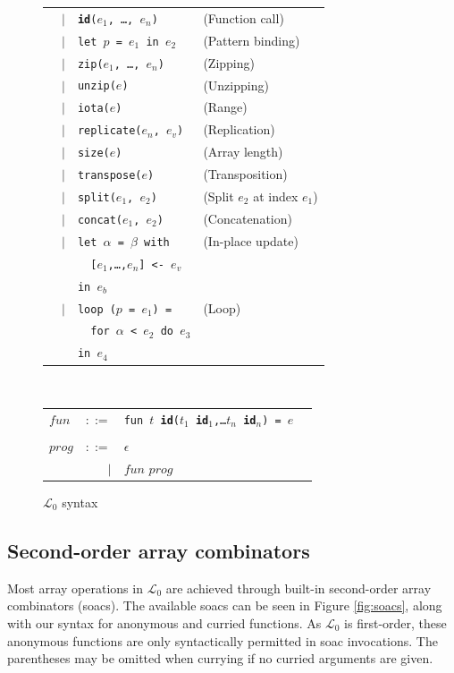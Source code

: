\documentclass{sigplanconf}  %
\newcommand{\LO}{$\mathcal{L}_0$}
\begin{document}
\begin{figure}[bt]
\begin{tabular}{lrll}
& $|$ & {\tt {\bf id}($e_{1}$, \ldots, $e_{n}$)} & (Function call) \\
& $|$ & {\tt let $p$ = $e_{1}$ in $e_{2}$} & (Pattern binding) \\
& $|$ & {\tt zip($e_{1}$, \ldots, $e_{n}$)} & (Zipping) \\
& $|$ & {\tt unzip($e$)} & (Unzipping) \\
& $|$ & {\tt iota($e$)} & (Range) \\
& $|$ & {\tt replicate($e_{n}$, $e_{v}$)} & (Replication) \\
& $|$ & {\tt size($e$)} & (Array length) \\
& $|$ & {\tt transpose($e$)} & (Transposition) \\
& $|$ & {\tt split($e_{1}$, $e_{2}$)} & (Split $e_{2}$ at index $e_{1}$) \\
& $|$ & {\tt concat($e_{1}$, $e_{2}$)} & (Concatenation) \\
& $|$ & {\tt let $\alpha$ = $\beta$ with} & (In-place update) \\
&     & {\tt \ \ [$e_{1}$,\ldots,$e_{n}$] <- $e_{v}$} \\
&     & {\tt in $e_{b}$} \\
& $|$ & {\tt loop ($p$ = $e_{1}$) =} & (Loop) \\
&     & {\tt \ \ for $\alpha$ < $e_{2}$ do $e_{3}$} \\
&     & {\tt in $e_{4}$} \\
\end{tabular}
\\
\begin{tabular}{lrll}
$fun$ & $::=$ & {\tt fun $t$ {\bf id}($t_{1}$ {\bf id}$_{1}$,\ldots $t_{n}$ {\bf id}$_{n}$) = $e$} \\
\\
$prog$ & $::=$ & $\epsilon$ \\
       & $|$   & $fun$ $prog$
\end{tabular}
\caption{\LO{} syntax}
\label{fig:fo-syntax}
\end{figure}

\subsection{Second-order array combinators}
\label{sec:soacs}

Most array operations in \LO{} are achieved through built-in second-order
array combinators ({\sc soac}s).  The available {\sc soac}s can be seen in Figure
\ref{fig:soacs}, along with our syntax for anonymous and curried
functions.  As \LO{} is first-order, these anonymous functions are
only syntactically permitted in {\sc soac} invocations.  The parentheses may
be omitted when currying if no curried arguments are given.
\end{document}
